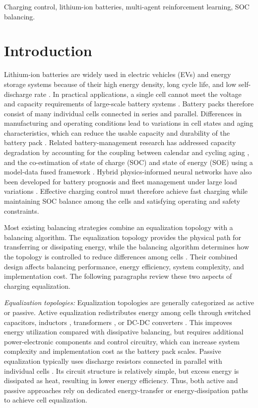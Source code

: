 \documentclass[10pt,journal,letterpaper]{IEEEtran}
\newcommand{\newrev}[1]{#1}
\begin{document}
\begin{IEEEkeywords}
Charging control, lithium-ion batteries, multi-agent reinforcement learning, SOC balancing.
\end{IEEEkeywords}

\section{Introduction}

Lithium-ion batteries are widely used in electric vehicles (EVs) and energy storage systems because of their high energy density, long cycle life, and low self-discharge rate \cite{1}. In practical applications, a single cell cannot meet the voltage and capacity requirements of large-scale battery systems \cite{3, 4}. Battery packs therefore consist of many individual cells connected in series and parallel. Differences in manufacturing and operating conditions lead to variations in cell states and aging characteristics, which can reduce the usable capacity and durability of the battery pack \cite{4}. Related battery-management research has addressed capacity degradation by accounting for the coupling between calendar and cycling aging \cite{liu2024degradation}, and the co-estimation of state of charge (SOC) and state of energy (SOE) using a model-data fused framework \cite{duan2026coestimation}. Hybrid physics-informed neural networks have also been developed for battery prognosis and fleet management under large load variations \cite{fricke2026prognosis}. Effective charging control must therefore achieve fast charging while maintaining SOC balance among the cells and satisfying operating and safety constraints.

Most existing balancing strategies combine an equalization topology with a balancing algorithm. The equalization topology provides the physical path for transferring or dissipating energy, while the balancing algorithm determines how the topology is controlled to reduce differences among cells \cite{7, 8}. Their combined design affects balancing performance, energy efficiency, system complexity, and implementation cost. The following paragraphs review these two aspects of charging equalization.

\newrev{\textit{Equalization topologies:} Equalization topologies are generally categorized as active or passive. Active equalization redistributes energy among cells through switched capacitors, inductors \cite{9}, transformers \cite{10}, or DC-DC converters \cite{11}. This improves energy utilization compared with dissipative balancing, but requires additional power-electronic components and control circuitry, which can increase system complexity and implementation cost as the battery pack scales. Passive equalization typically uses discharge resistors connected in parallel with individual cells \cite{12}. Its circuit structure is relatively simple, but excess energy is dissipated as heat, resulting in lower energy efficiency. Thus, both active and passive approaches rely on dedicated energy-transfer or energy-dissipation paths to achieve cell equalization.}
\end{document}
